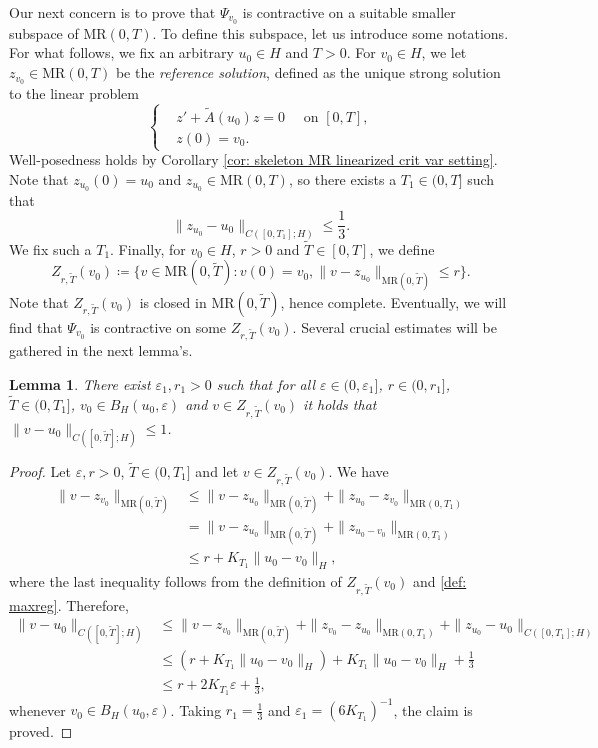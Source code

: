 \documentclass{amsart}
\renewcommand{\MR}{\mathrm{MR}}
\newcommand{\<}{\langle}
\newcommand{\?}{\rangle}
\theoremstyle{plain}
\theoremstyle{remark}
\theoremstyle{plain}
\newtheorem{lemma}[theorem]{Lemma}
\numberwithin{equation}{section}
\newcommand{\eps}{\varepsilon}
\begin{document}
Our next concern is to prove that $\Psi_{v_0}$ is contractive on a suitable smaller subspace of $\MR(0,T)$. To define this subspace, let us introduce some notations. For what follows, we fix an arbitrary $u_0\in H$ and $T>0$.
For $v_0\in H$, we let $z_{v_0}\in \MR(0,T)$ be the \emph{reference solution}, defined as the unique strong solution to the linear problem
\begin{equation}\label{eq:def z_v_0}
  \begin{cases}
    &z'+\tilde{A}(u_0)z=0\quad \text{ on } [0,T], \\
    &z(0)=v_0.
  \end{cases}
\end{equation}
Well-posedness holds by Corollary \ref{cor: skeleton MR linearized crit var setting}.
Note that $z_{u_0}(0)=u_0$ and $z_{u_0}\in \MR(0,T)$, so there exists a $T_1\in(0,T]$ such that
\begin{equation}\label{eq: def T_1}
  \|z_{u_0}-u_0\|_{C([0,T_1];H)}\leq \frac{1}{3}.
\end{equation}
We fix such a  $T_1$.
Finally, for $v_0\in H$, $r>0$ and $\tilde{T}\in[0,T]$, we define
\begin{equation}\label{eq:def Z_rT}
Z_{r,\tilde{T}}(v_0)\coloneqq \{v\in \MR(0,\tilde{T}):v(0)=v_0, \|v-z_{u_0}\|_{\MR(0,\tilde{T})}\leq r\}.
\end{equation}
Note that $Z_{r,\tilde{T}}(v_0)$ is closed in $\MR(0,\tilde{T})$, hence complete.
Eventually, we will find that $\Psi_{v_0}$ is contractive on some $Z_{r,\tilde{T}}(v_0)$.
Several crucial estimates will be gathered in the next lemma's.


\begin{lemma}\label{lem:eps T_1}
There exist $\eps_1,r_1>0$ such that for all $\eps\in(0,\eps_1]$, $r\in(0,r_1]$, $\tilde{T}\in(0,T_1]$, $v_0\in B_H(u_0,\eps)$ and $v\in Z_{r,\tilde{T}}(v_0)$ it holds that  $\|v-u_0\|_{C([0,\tilde{T}];H)}\leq 1$.
\end{lemma}
\begin{proof}
Let $\eps,r>0$, $\tilde{T}\in(0,T_1]$ and let $v\in Z_{r,\tilde{T}}(v_0)$.
We have
  \begin{align*}
     \|v-z_{v_0}\|_{\MR(0,\tilde{T})} &\leq \|v-z_{u_0}\|_{\MR(0,\tilde{T})} + \|z_{u_0}-z_{v_0}\|_{\MR(0,T_1)}\\
    &= \|v-z_{u_0}\|_{\MR(0,\tilde{T})} + \|z_{u_0-v_0}\|_{\MR(0,T_1)}\\
    &\leq r + K_{T_1}\|{u_0-v_0}\|_{H},
  \end{align*}
  where the last inequality follows from the definition of $Z_{r,\tilde{T}}(v_0)$ and \eqref{def: maxreg}.
  Therefore,
  \begin{align*}
    \|v-u_0\|_{C([0,\tilde{T}];H)} &\leq \|v-z_{v_0}\|_{\MR(0,\tilde{T})}+\|z_{v_0}-z_{u_0}\|_{\MR(0,T_1)}+\|z_{u_0}-u_0\|_{C([0,T_1];H)} \\
    &\leq \left(r + K_{T_1}\|{u_0-v_0}\|_{H}\right) +  K_{T_1}\|{u_0-v_0}\|_{H}+\frac{1}{3}\\
    &\leq r+2 K_{T_1}\eps+\frac{1}{3},
  \end{align*}
  whenever $v_0\in B_H(u_0,\eps)$. Taking $r_1= \frac{1}{3}$ and $\eps_1=(6 K_{T_1})^{-1}$, the claim is proved.
\end{proof}
\end{document}
